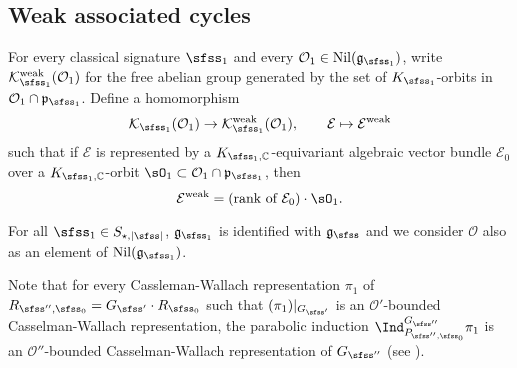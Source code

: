 \documentclass[12pt,a4paper]{amsart}
\def\abs#1{\left|{#1}\right|}
\newcommand{\CE}{{\mathcal {E}}}
\newcommand{\CK}{{\mathcal {K}}}
\newcommand{\CO}{{\mathcal {O}}}
\newcommand{\g}{\mathfrak g}
\newcommand{\p}{\mathfrak p}
\numberwithin{equation}{section}
\theoremstyle{remark}
\begin{document}
\subsection{Weak associated cycles}

For every classical signature $\sfss_1$ and every $\CO_1\in \mathrm{Nil}(\g_{\sfss_1})$, write $\CK^{\mathrm{weak}}_{\sfss_1}(\CO_1)$
for the free abelian group generated by the set of $K_{\sfss_1}$-orbits in $\CO_1\cap \p_{\sfss_1}$. Define a homomorphism
\[
  \CK_{\sfss_1}(\CO_1)\rightarrow \CK^{\mathrm{weak}}_{\sfss_1}(\CO_1), \qquad \CE\mapsto \CE^{\mathrm{weak}}
\]
such that if $\CE$ is represented by a $K_{\sfss_1,\C}$-equivariant algebraic vector bundle $\CE_0$ over a $K_{\sfss_1,\C}$-orbit $\sO_1\subset \CO_1\cap \p_{\sfss_1}$, then
\[
   \CE^{\mathrm{weak}}=\textrm{(rank of $\CE_0$)}\cdot \sO_1. 
\]

For all $\sfss_1\in S_{\star, \abs{\sfss}}$,  $\g_{\sfss_1}$ is identified with $\g_{\sfss}$ and we consider $\CO$ also as an element of $\mathrm{Nil}(\g_{\sfss_1})$. 


Note that for every Cassleman-Wallach representation $\pi_1$ of $R_{\sfss'',\sfss_0}=G_{\sfss'}\cdot R_{\sfss_0}$ such that $(\pi_1)|_{G_{\sfss'}}$ is an $\CO'$-bounded Casselman-Wallach representation,   the parabolic induction
$\Ind_{P_{\sfss'',\sfss_0}}^{G_{\sfss''}} \pi_1$ is an $\CO''$-bounded Casselman-Wallach representation  of $G_{\sfss''}$ (see \cite[Corollary~5.0.10]{B.Orbit}).
\end{document}

